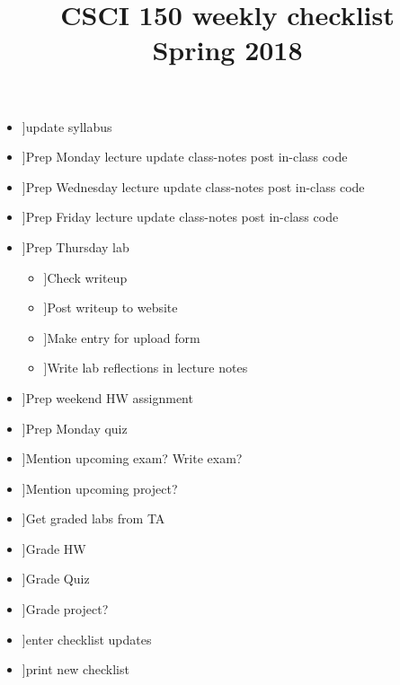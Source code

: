 \documentclass{article}
\title{CSCI 150 weekly checklist \\ {\small Spring 2018}}
\date{}
\newcommand{\cbox}{\framebox[1em]{\phantom{x}}}
\newcommand{\ci}{\item[\cbox]}
\newcommand{\also}{\cbox \hspace{1ex}}
\begin{document}
\maketitle
\thispagestyle{empty}

\begin{itemize}
\ci update syllabus
\ci Prep Monday lecture \also update class-notes \also post in-class code
\ci Prep Wednesday lecture \also update class-notes \also post in-class code
\ci Prep Friday lecture \also update class-notes \also post in-class code \\

\ci Prep Thursday lab
\begin{itemize}
\ci Check writeup
\ci Post writeup to website
\ci Make entry for upload form
\ci Write lab reflections in lecture notes
\end{itemize}
\ci Prep weekend HW assignment \\
\ci Prep Monday quiz

\ci Mention upcoming exam? \also Write exam?
\ci Mention upcoming project? \\

\ci Get graded labs from TA
\ci Grade HW
\ci Grade Quiz
\ci Grade project? \\

\ci enter checklist updates
\ci print new checklist
\end{itemize}
\end{document}
